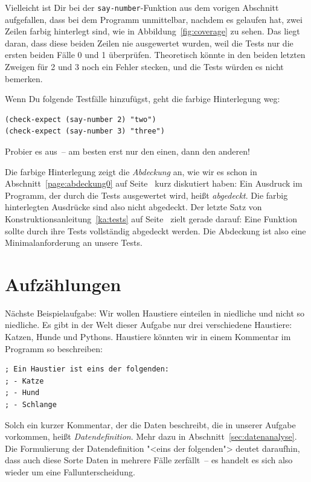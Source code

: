 Vielleicht ist Dir bei der \lstinline{say-number}-Funktion aus dem
vorigen Abschnitt aufgefallen, dass bei dem Programm unmittelbar, nachdem
es gelaufen hat, zwei Zeilen farbig
hinterlegt sind, wie in Abbildung~\ref{fig:coverage} zu sehen.  Das liegt
daran, dass diese beiden Zeilen nie ausgewertet wurden, weil die
Tests nur die ersten beiden Fälle 0 und 1 überprüfen.  Theoretisch
könnte in den beiden letzten Zweigen für 2 und 3 noch ein Fehler
stecken, und die Tests würden es nicht bemerken.

Wenn Du folgende Testfälle hinzufügst, geht die farbige Hinterlegung weg:
%
\begin{lstlisting}
(check-expect (say-number 2) "two")
(check-expect (say-number 3) "three")
\end{lstlisting}
%
Probier es aus~-- am besten erst nur den einen, dann den anderen!

Die farbige Hinterlegung zeigt die \textit{Abdeckung} an, wie wir es
schon in Abschnitt~\ref{page:abdeckung0} auf
Seite~\pageref{page:abdeckung0} kurz diskutiert haben: Ein Ausdruck im
Programm, der durch die Tests ausgewertet wird, heißt
\textit{abgedeckt}.  Die farbig hinterlegten Ausdrücke sind also nicht
abgedeckt.  Der letzte Satz von Konstruktionsanleitung~\ref{ka:tests}
auf Seite~\pageref{ka:tests} zielt gerade darauf: Eine Funktion sollte
durch ihre Tests vollständig abgedeckt werden.  Die Abdeckung ist also
eine Minimalanforderung an unsere Tests.

\section{Aufzählungen}

Nächste Beispielaufgabe: Wir wollen Haustiere einteilen in niedliche
und nicht so niedliche.  Es gibt in der Welt dieser Aufgabe nur drei
verschiedene Haustiere: Katzen, Hunde und Pythons.  Haustiere
könnten wir in einem Kommentar im Programm so beschreiben:
%
\label{sec:datendefinition}
\begin{lstlisting}
; Ein Haustier ist eins der folgenden:
; - Katze
; - Hund
; - Schlange
\end{lstlisting}
%
Solch ein kurzer Kommentar, der die Daten beschreibt, die in unserer
Aufgabe vorkommen, heißt
\textit{Datendefinition}.  Mehr dazu in
Abschnitt~\ref{sec:datenanalyse}.  Die Formulierung der
Datendefinition "<eins der folgenden"> deutet daraufhin, dass auch
diese Sorte Daten in mehrere Fälle zerfällt~-- es handelt es sich also
wieder um eine Fallunterscheidung.

